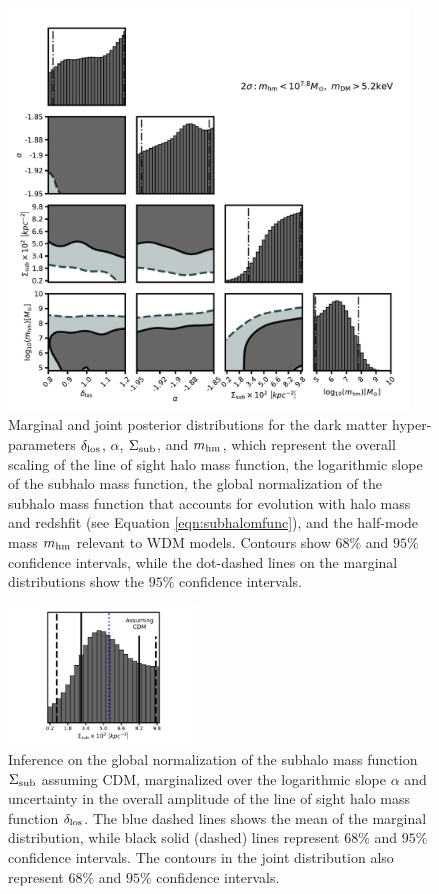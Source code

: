 \begin{figure}
	\includegraphics[clip,trim=0.2cm 0cm 0.5cm
	0.5cm,width=0.95\textwidth,keepaspectratio]{./figures_wdmchillsout/joint_inference.pdf}
	\caption{\label{fig:mainresult} Marginal and joint posterior distributions for the dark matter hyper-parameters $\delta_{\rm{los}}$, $\alpha$, $\Sigma_{\rm{sub}}$, and ${m_{\rm{hm}}}$, which represent the overall scaling of the line of sight halo mass function, the logarithmic slope of the subhalo mass function, the global normalization of the subhalo mass function that accounts for evolution with halo mass and redshfit (see Equation \ref{eqn:subhalomfunc}), and the half-mode mass ${m_{\rm{hm}}}$ relevant to WDM models. Contours show $68\%$ and $95\%$ confidence intervals, while the dot-dashed lines on the marginal distributions show the $95\%$ confidence intervals.}
\end{figure}	

\begin{figure}
	\includegraphics[clip,trim=3cm 0.3cm 3cm
	0cm,width=0.45\textwidth,keepaspectratio]{./figures_wdmchillsout/CDM_joint.pdf}
	\caption{\label{fig:cdmsigmasub} Inference on the global normalization of the subhalo mass function $\Sigma_{\rm{sub}}$ assuming CDM, marginalized over the logarithmic slope $\alpha$ and uncertainty in the overall amplitude of the line of sight halo mass function $\delta_{\rm{los}}$. The blue dashed lines shows the mean of the marginal distribution, while black solid (dashed) lines represent $68\%$ and $95 \%$ confidence intervals. The contours in the joint distribution also represent $68\%$ and $95 \%$ confidence intervals.}
\end{figure}	

